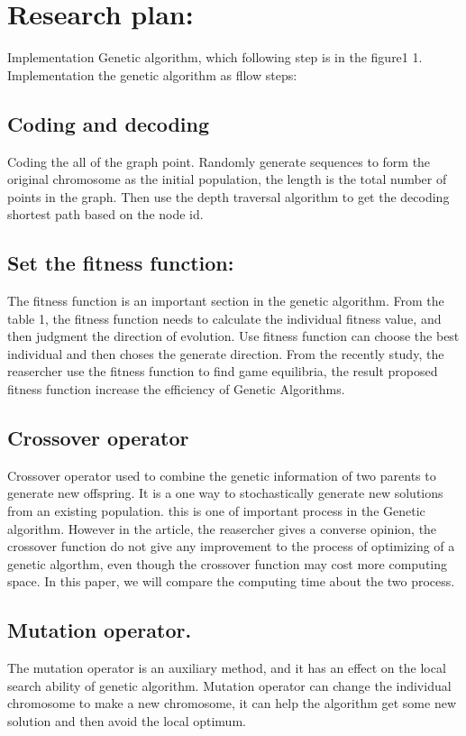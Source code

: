 \documentclass[12pt]{article}
\begin{document}
\section{Research plan:}
Implementation Genetic algorithm, which following step is in the figure1
1. Implementation the genetic algorithm as fllow steps:
\subsection{Coding and decoding}
Coding the all of the graph point. Randomly generate sequences to form the original chromosome as the initial population, the length is the total number of points in the graph. Then use the depth traversal algorithm to get the decoding shortest path based on the node id.
\subsection{Set the fitness function:}
The fitness function is an important section in the genetic algorithm. From the table 1, the fitness function needs to calculate the individual fitness value, and then judgment the direction of evolution. Use fitness function can choose the best individual and then choses the generate direction. From the recently study\cite{Gunturu2017}, the reasercher use the fitness function to find game equilibria, the result proposed  fitness function increase the efficiency of Genetic Algorithms. 
\subsection{Crossover operator }
Crossover operator used to combine the genetic information of two parents to generate new offspring. It is a one way to stochastically generate new solutions from an existing population. this is one of important process in the Genetic algorithm. However in the article\cite{Osaba2013}, the reasercher gives a converse opinion, the crossover function do not give any improvement to the process of optimizing of a genetic algorthm, even though the crossover function may cost more computing space. In this paper, we will compare the computing time about the two process.

\subsection{Mutation operator.}
The mutation operator is an auxiliary method, and it has an effect on the local search ability of genetic algorithm. Mutation operator can change the individual chromosome to make a new chromosome, it can help the algorithm get some new solution and then avoid the local optimum.
\end{document}
